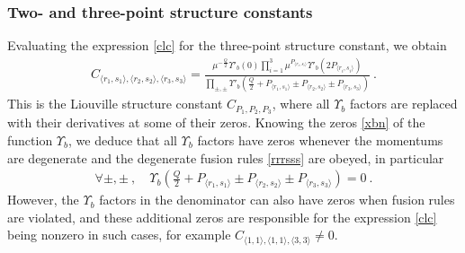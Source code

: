 \documentclass[12pt, a4paper, notitlepage, twoside]{report}
\numberwithin{equation}{section}
\theoremstyle{break}
\begin{document}
\subsubsection{Two- and three-point structure constants}

Evaluating the expression \eqref{clc} for the three-point structure constant, we obtain
\begin{align}
 C_{\langle r_1,s_1\rangle ,\langle r_2,s_2\rangle ,\langle r_3,s_3 \rangle} =   \frac{\mu^{-\frac{Q}{2}}\Upsilon'_b(0)\prod_{i=1}^3 \mu^{P_{\langle r_i,s_i \rangle}}\Upsilon'_b(2P_{\langle r_i,s_i \rangle}) }{\prod_{\pm,\pm} \Upsilon'_b\left(\tfrac{Q}{2}+P_{\langle r_1,s_1 \rangle}\pm P_{\langle r_2,s_2 \rangle} \pm P_{\langle r_3,s_3 \rangle}\right)} \ .
\label{crisi}
\end{align}
This is the Liouville structure constant $C_{P_1,P_2,P_3}$, where all $\Upsilon_b$ factors are replaced with their derivatives at some of their zeros.
Knowing the zeros \eqref{xbn} of the function $\Upsilon_b$, we deduce that 
all $\Upsilon_b$ factors have zeros whenever
the momentums are degenerate and the degenerate fusion rules \eqref{rrrsss} are obeyed, in particular
\begin{align}
 \forall \pm, \pm\ , \quad \Upsilon_b\left(\tfrac{Q}{2}+P_{\langle r_1,s_1 \rangle}\pm P_{\langle r_2,s_2 \rangle} \pm P_{\langle r_3,s_3 \rangle}\right) = 0\ .
\end{align}
However, the $\Upsilon_b$ factors in the denominator can also have zeros when fusion rules are violated, and these additional zeros are responsible for the expression \eqref{clc} being nonzero in such cases, for example $C_{\langle 1,1\rangle , \langle 1,1 \rangle,\langle 3,3 \rangle} \neq 0$.
\end{document}
